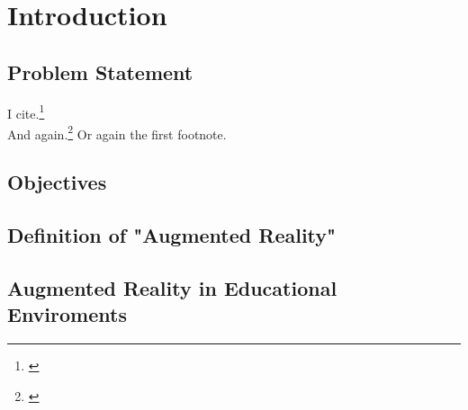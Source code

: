 \section{Introduction}
\subsection{Problem Statement}
I cite.\footnote{\cite{Test.1900}\label{test_1900}}\\
And again.\footnote{\cite{Test.1901}} Or again the first footnote.
\subsection{Objectives}
\subsection{Definition of "Augmented Reality"}
\subsection{Augmented Reality in Educational Enviroments}